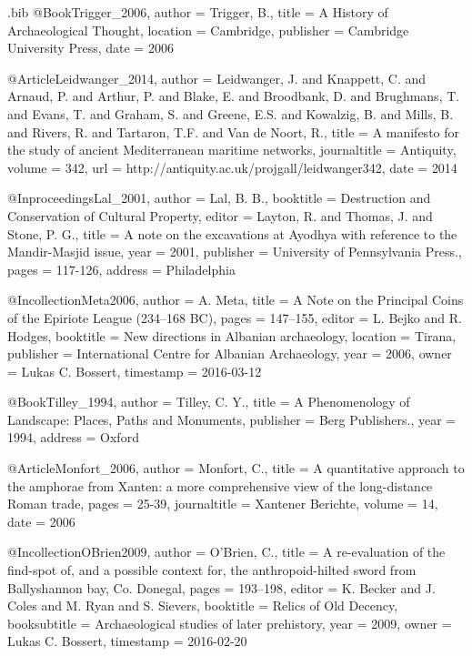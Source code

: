 \begin{filecontents}{\identifier.bib}
@Book{Trigger_2006,
  author =    {Trigger, B.},
  title =     {A History of Archaeological Thought},
  location =  {Cambridge},
  publisher = {Cambridge University Press},
  date =      {2006}
}

@Article{Leidwanger_2014,
  author =       {Leidwanger, J. and Knappett, C. and Arnaud, P. and Arthur, P. and Blake, E. and Broodbank, D. and Brughmans, T. and Evans, T. and Graham, S. and Greene, E.S. and Kowalzig, B. and Mills, B. and Rivers, R. and Tartaron, T.F. and Van de Noort, R.},
  title =        {A manifesto for the study of ancient Mediterranean maritime networks},
  journaltitle = {Antiquity},
  volume =       {342},
  url =          {http://antiquity.ac.uk/projgall/leidwanger342},
  date =         {2014}
}

@Inproceedings{Lal_2001,
  author =    {Lal, B. B.},
  booktitle = {Destruction and Conservation of Cultural Property},
  editor =    {Layton, R. and Thomas, J. and Stone, P. G.},
  title =     {A note on the excavations at Ayodhya with reference to the Mandir-Masjid issue},
  year =      {2001},
  publisher = {University of Pennsylvania Press.},
  pages =     {117-126},
  address =   {Philadelphia}
}

@Incollection{Meta2006,
  author =    {A. Meta},
  title =     {A Note on the Principal Coins of the Epiriote League (234–168 BC)},
  pages =     {147--155},
  editor =    {L. Bejko and R. Hodges},
  booktitle = {New directions in Albanian archaeology},
  location =  {Tirana},
  publisher = {International Centre for Albanian Archaeology},
  year =      {2006},
  owner =     {Lukas C. Bossert},
  timestamp = {2016-03-12}
}

@Book{Tilley_1994,
  author =    {Tilley, C. Y.},
  title =     {A Phenomenology of Landscape: Places, Paths and Monuments},
  publisher = {Berg Publishers.},
  year =      {1994},
  address =   {Oxford}
}

@Article{Monfort_2006,
  author =       {Monfort, C.},
  title =        {A quantitative approach to the amphorae from Xanten: a more comprehensive view of the long-distance Roman trade},
  pages =        {25-39},
  journaltitle = {Xantener Berichte},
  volume =       {14},
  date =         {2006}
}

@Incollection{OBrien2009,
  author =       {O’Brien, C.},
  title =        {A re-evaluation of the find-spot of, and a possible context for, the anthropoid-hilted sword from Ballyshannon bay, Co. Donegal},
  pages =        {193--198},
  editor =       {K. Becker and J. Coles and M. Ryan and S. Sievers},
  booktitle =    {Relics of Old Decency},
  booksubtitle = {Archaeological studies of later prehistory},
  year =         {2009},
  owner =        {Lukas C. Bossert},
  timestamp =    {2016-02-20}
}


\end{filecontents}
